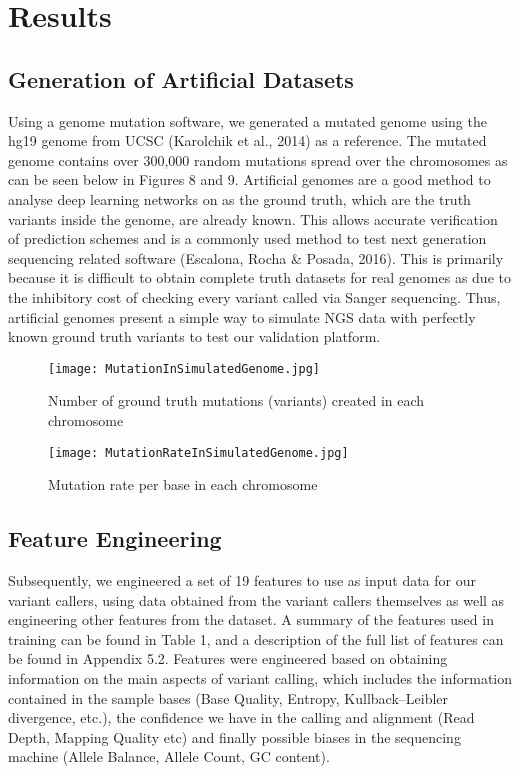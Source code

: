 \documentclass{article}
\begin{document}
\newpage
\section{Results}
\subsection{Generation of Artificial Datasets}
Using a genome mutation software, we generated a mutated genome using the hg19 genome from UCSC (Karolchik et al., 2014) as a reference. The mutated genome contains over 300,000 random mutations spread over the chromosomes as can be seen below in Figures 8 and 9. Artificial genomes are a good method to analyse deep learning networks on as the ground truth, which are the truth variants inside the genome, are already known. This allows accurate verification of prediction schemes and is a commonly used method to test next generation sequencing related software (Escalona, Rocha \& Posada, 2016). This is primarily because it is difficult to obtain complete truth datasets for real genomes as due to the inhibitory cost of checking every variant called via Sanger sequencing. Thus, artificial genomes present a simple way to simulate NGS data with perfectly known ground truth variants to test our validation platform.

\begin{figure}[H]
\centering
\texttt{[image: MutationInSimulatedGenome.jpg]}
\caption{Number of ground truth mutations (variants) created in each chromosome }
\end{figure}

\begin{figure}[H]
\centering
\texttt{[image: MutationRateInSimulatedGenome.jpg]}
\caption{Mutation rate per base in each chromosome}
\end{figure}

\subsection{Feature Engineering}
Subsequently, we engineered a set of 19 features to use as input data for our variant callers, using data obtained from the variant callers themselves as well as engineering other features from the dataset. A summary of the features used in training can be found in Table 1, and a description of the full list of features can be found in Appendix 5.2. Features were engineered based on obtaining information on the main aspects of variant calling, which includes the information contained in the sample bases (Base Quality, Entropy, Kullback–Leibler divergence, etc.), the confidence we have in the calling and alignment (Read Depth, Mapping Quality etc) and finally possible biases in the sequencing machine (Allele Balance, Allele Count, GC content).
\end{document}
